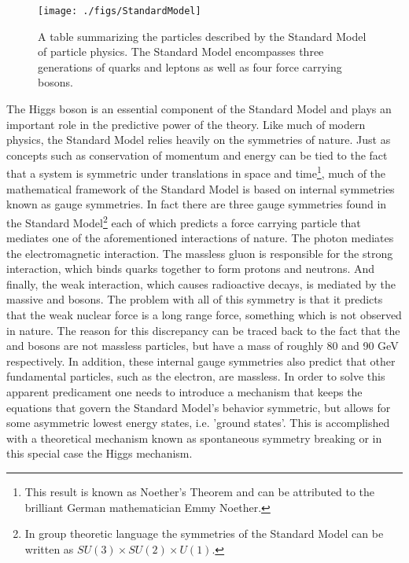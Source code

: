 \begin{figure}[htbp]
    \centering
    \texttt{[image: ./figs/StandardModel]}
    \caption{A table summarizing the particles described by the
    Standard Model of particle physics. The Standard Model encompasses
    three generations of quarks and leptons as well as four force carrying
    bosons.}
    \label{fig:sm}
\end{figure}

The Higgs boson is an essential component of the Standard Model and plays
an important role in the predictive power of the theory. Like much of modern
physics, the Standard Model relies heavily on the symmetries of nature. Just
as concepts such as conservation of momentum and energy can be tied to the 
fact that a system is symmetric under translations in space and time\footnote{
This result is known as Noether's Theorem and can be attributed to the 
brilliant German mathematician Emmy Noether.}, much of the mathematical 
framework of the Standard Model is based on internal symmetries 
known as gauge symmetries. In fact there are three gauge symmetries found
in the Standard Model\footnote{ In group theoretic language the symmetries of
the Standard Model can be written as $SU(3) \times SU(2) \times U(1)$.} 
each of which predicts a force carrying particle that mediates one of the 
aforementioned interactions of nature. The photon mediates the 
electromagnetic interaction. The massless gluon is responsible for the strong 
interaction, which binds quarks together to form protons and neutrons.
And finally, the weak interaction, which causes radioactive decays, 
is mediated by the massive \WBosons and \ZBoson bosons. The problem with all 
of this symmetry is that it predicts that the weak nuclear force is a long
range force, something which is not observed in nature. The reason for this
discrepancy can be traced back to the fact that the \WBoson and \ZBoson bosons are
not massless particles, but have a mass of roughly 80 and 90 GeV respectively. 
In addition, these internal gauge symmetries also predict that other 
fundamental particles, such as the electron, are massless. In order to solve
this apparent predicament one needs to introduce a mechanism that keeps the
equations that govern the Standard Model's behavior symmetric, but allows for
some asymmetric lowest energy states, i.e. 'ground states'. 
This is accomplished with a theoretical mechanism known as spontaneous
symmetry breaking or in this special case the Higgs mechanism.

